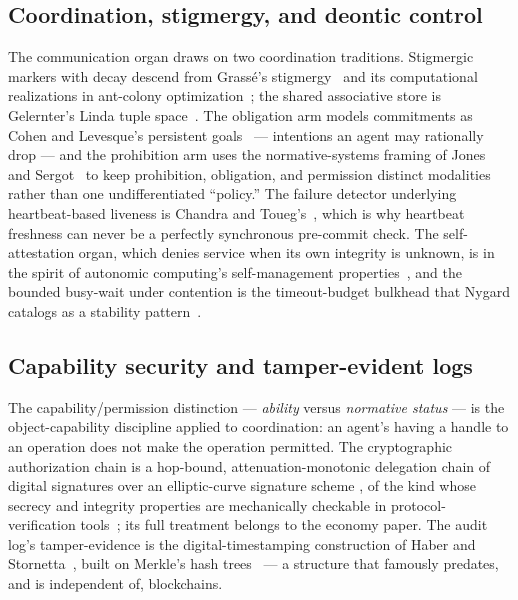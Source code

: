 \documentclass[11pt,a4paper]{article}
\theoremstyle{definition}
\theoremstyle{remark}
\begin{document}
\subsection{Coordination, stigmergy, and deontic control}

The communication organ draws on two coordination traditions. Stigmergic markers
with decay descend from Grass\'e's stigmergy~\cite{grasse1959} and its
computational realizations in ant-colony optimization~\cite{dorigo1999}; the shared
associative store is Gelernter's Linda tuple space~\cite{gelernter1985}. The
obligation arm models commitments as Cohen and Levesque's persistent
goals~\cite{cohenlevesque1990} --- intentions an agent may rationally drop --- and
the prohibition arm uses the normative-systems framing of Jones and
Sergot~\cite{jonessergot1993} to keep prohibition, obligation, and permission
distinct modalities rather than one undifferentiated ``policy.'' The failure
detector underlying heartbeat-based liveness is Chandra and Toueg's~\cite{chandratoueg1996},
which is why heartbeat freshness can never be a perfectly synchronous pre-commit
check. The self-attestation organ, which denies service when its own integrity is
unknown, is in the spirit of autonomic computing's self-management
properties~\cite{kephartchess2003}, and the bounded busy-wait under contention is
the timeout-budget bulkhead that Nygard catalogs as a stability
pattern~\cite{nygard2018}.

\subsection{Capability security and tamper-evident logs}

The capability/permission distinction --- \emph{ability} versus \emph{normative
status} --- is the object-capability discipline applied to coordination: an agent's
having a handle to an operation does not make the operation permitted. The
cryptographic authorization chain is a hop-bound, attenuation-monotonic delegation
chain of digital signatures over an elliptic-curve signature scheme
\cite{bernstein2012high}, of the kind whose secrecy and integrity properties are
mechanically checkable in protocol-verification tools~\cite{blanchet2016modeling};
its full treatment belongs to the economy paper. The audit log's tamper-evidence is
the digital-timestamping construction of Haber and
Stornetta~\cite{haberstornetta1991}, built on Merkle's hash trees~\cite{merkle1987}
--- a structure that famously predates, and is independent of, blockchains.
\end{document}
